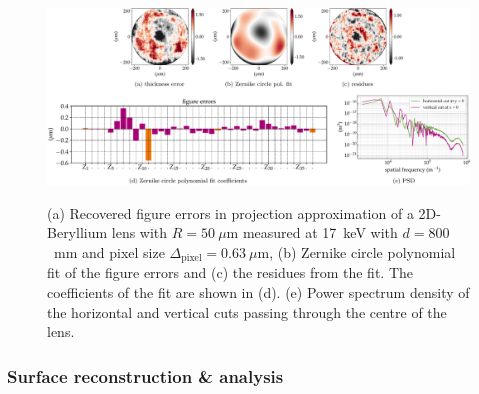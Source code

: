 \begin{refsection}
\begin{figure}[t]
        \centering
        {\includegraphics[width=1\linewidth]{figures/ch04b/recovered_thickness.pdf}}
        \caption[Recovered figure errors in projection approximation]{(a) Recovered figure errors in projection approximation of a 2D-Beryllium lens with $R=50~\mu$m measured at 17~keV with $d=800$~mm and pixel size $\Delta_\text{pixel}= 0.63~\mu$m, (b) Zernike circle polynomial fit of the figure errors and (c) the residues from the fit. The coefficients of the fit are shown in (d). (e) Power spectrum density of the horizontal and vertical cuts passing through the centre of the lens.}\label{fig:recovered_thickness}
\end{figure}

\subsubsection*{Surface reconstruction \& analysis}


\end{refsection}
